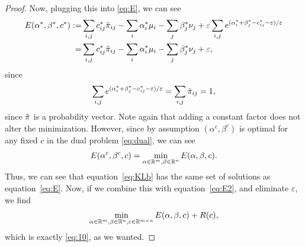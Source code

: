 \begin{proof}
	Now, plugging this into \eqref{eq:E}, we can see
	\begin{align}
		E(\alpha^*, \beta^*, c^*) := & \sum_{i,j} c_{ij}^* \hat{\pi}_{ij} - \sum_i \alpha_i^* \mu_i - \sum_j \beta_j^* \nu_j + \varepsilon \sum_{i,j} e^{(\alpha_i^* + \beta_j^* - c_{ij}^*-\varepsilon)/\varepsilon} \nonumber\\
		= & \sum_{i,j} c_{ij}^* \hat{\pi}_{ij} - \sum_i \alpha_i^* \mu_i - \sum_j \beta_j^* \nu_j + \varepsilon ,
		\label{eq:E2}
	\end{align}
	since 
	\begin{equation*}
		\sum_{i,j} e^{(\alpha^*_i + \beta^*_j - c_{ij}^*-\varepsilon)/\varepsilon} = \sum_{i,j} \hat{\pi}_{ij} = 1,
	\end{equation*}
	since $\hat{\pi}$ is a probability vector. Note again that adding a constant factor does not alter the minimization. However, since by assumption $(\alpha^c, \beta^c)$ is optimal for any fixed $c$ in the dual problem \eqref{eq:dual}, we can see 
	\begin{equation*}
		E(\alpha^c, \beta^c, c) = \min_{\alpha\in\mathbb{R}^m, \beta \in \mathbb{R}^n} E(\alpha, \beta, c).
	\end{equation*}
	Thus, we can see that equation~\ref{eq:KLb} has the same set of solutions as equation~\eqref{eq:E}. Now, if we combine this with equation~\eqref{eq:E2}, and eliminate $\varepsilon$, we find 
	\begin{equation*}
		\min _{\alpha\in\mathbb{R}^m, \beta \in \mathbb{R}^n, c\in \mathbb{R}^{m \times n}} E(\alpha, \beta, c)+R(c), 
	\end{equation*}
	which is exactly \eqref{eq:10}, as we wanted. \par 
\end{proof}

